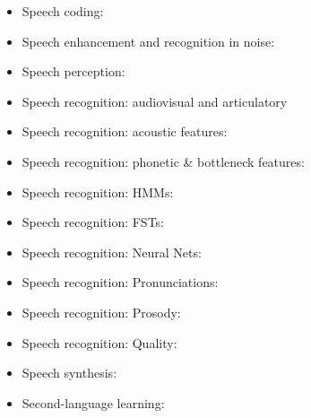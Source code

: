 \documentclass{article}
\begin{document}
\begin{itemize}
\item Speech coding:~\cite{Conway82,Schroeder85,Lamblin89}
\item Speech enhancement and recognition in noise:~\cite{Cooke01b,Ephraim85,Gales96,Martin01,Nadas89}
\item Speech perception:~\cite{Chistovich85,Cooper88,Delattre55,Fowler91,Hickok07,Iverson95,Lotto98,Miller55,Whalen89}
\item Speech recognition: audiovisual and articulatory~\cite{Chu00,Jackson88b,Neti00,Wrench00b}
\item Speech recognition: acoustic features:~\cite{Davis80,Ghitza97,Halberstadt98b,Hermansky90,Hermansky94,Hermansky99}
\item Speech recognition: phonetic \& bottleneck features:~\cite{AbdelattyAli01a,AbdelattyAli01b,Jansen07,Kirchhoff98,Liu96,Loizou95,Niyogi99,Sonderegger12,Vesely2012}
\item Speech recognition: HMMs:~\cite{Rabiner86a,Gales98,Gauvain94,Juang86,Juang1990,Odell94,Povey02,Povey09}
\item Speech recognition: FSTs:~\cite{Mangu00,Mohri02,Oerder93}
\item Speech recognition: Neural Nets:~\cite{Bengio92a,Chan2016,Graves2006,Graves13,Hermansky2000,Jaakkola99,Vesely13interspeech,Waibel89a}
\item Speech recognition: Pronunciations:~\cite{FoslerLussier99a,Kanthak02,Ko2014,Livescu04b,Schultz2001,Sethy02,Vu2012}
\item Speech recognition: Prosody:~\cite{Chen04d,Hirschberg04b,Ostendorf03,Stolcke99}
\item Speech recognition: Quality:~\cite{Gillick89}
\item Speech synthesis:~\cite{Black2006,Fant86,Fujisaki84,Fukada1992,Klatt76,Klatt90,Maeda82,Tokuda2000,Yoshimura99,Yoshimura2001}
\item Second-language learning:~\cite{Best88,Bradlow97,Witt00}
  
\end{itemize}



\end{document}
